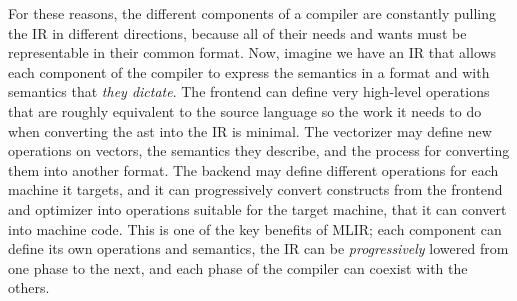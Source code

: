 For these reasons, the different components of a compiler are constantly pulling
the IR in different directions, because all of their needs and wants must be
representable in their common format.
Now, imagine we have an IR that allows each component of the compiler to express
the semantics in a format and with semantics that \textit{they dictate}.
The frontend can define very high-level operations that are roughly equivalent
to the source language so the work it needs to do when converting the \gls{ast}
into the IR is minimal.
The vectorizer may define new operations on vectors, the semantics they
describe, and the process for converting them into another format.
The backend may define different operations for each machine it targets,
and it can progressively convert constructs from the frontend and optimizer
into operations suitable for the target machine, that it can convert into
machine code.
This is one of the key benefits of MLIR; each component can define its own
operations and semantics, the IR can be \textit{progressively} lowered from
one phase to the next, and each phase of the compiler can coexist with the others.

